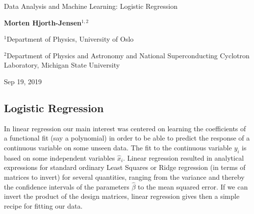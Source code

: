 \documentclass[%
oneside,                 %
final,                   %
10pt]{article}
\begin{document}

\newcommand{\exercisesection}[1]{\subsection*{#1}}






\thispagestyle{empty}

\begin{center}
{\LARGE\bf
\begin{spacing}{1.25}
Data Analysis and Machine Learning: Logistic Regression
\end{spacing}
}
\end{center}


\begin{center}
{\bf Morten Hjorth-Jensen${}^{1, 2}$} \\ [0mm]
\end{center}

\begin{center}
\centerline{{\small ${}^1$Department of Physics, University of Oslo}}
\centerline{{\small ${}^2$Department of Physics and Astronomy and National Superconducting Cyclotron Laboratory, Michigan State University}}
\end{center}
    

\begin{center}
Sep 19, 2019
\end{center}

\vspace{1cm}


\subsection*{Logistic Regression}

In linear regression our main interest was centered on learning the
coefficients of a functional fit (say a polynomial) in order to be
able to predict the response of a continuous variable on some unseen
data. The fit to the continuous variable $y_i$ is based on some
independent variables $\hat{x}_i$. Linear regression resulted in
analytical expressions for standard ordinary Least Squares or Ridge
regression (in terms of matrices to invert) for several quantities,
ranging from the variance and thereby the confidence intervals of the
parameters $\hat{\beta}$ to the mean squared error. If we can invert
the product of the design matrices, linear regression gives then a
simple recipe for fitting our data.
\end{document}

